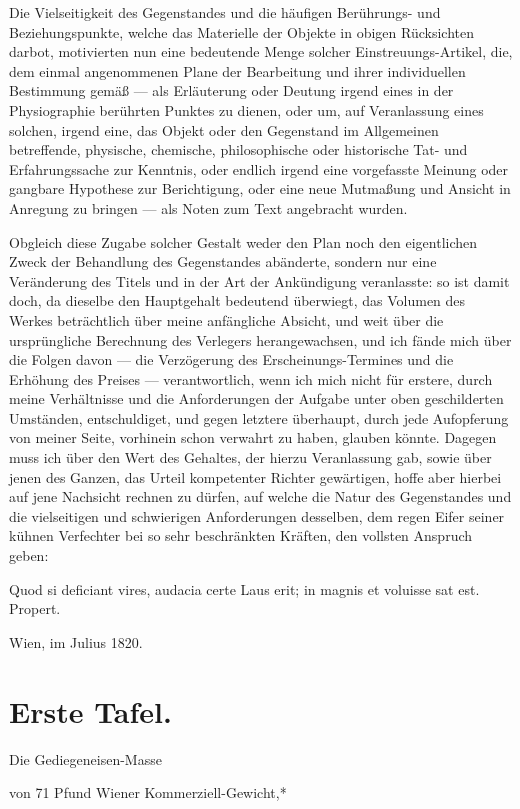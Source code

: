 \documentclass[a4paper, 11pt, oneside, german]{article}
\begin{document}
Die Vielseitigkeit des Gegenstandes und die häufigen Berührungs- und Beziehungspunkte, welche das Materielle der Objekte in obigen Rücksichten darbot, motivierten nun eine bedeutende Menge solcher Einstreuungs-Artikel, die, dem einmal angenommenen Plane der Bearbeitung und ihrer individuellen Bestimmung gemäß --- als Erläuterung oder Deutung irgend eines in der Physiographie berührten Punktes zu dienen, oder um, auf Veranlassung eines solchen, irgend eine, das Objekt oder den Gegenstand im Allgemeinen betreffende, physische, chemische, philosophische oder historische Tat- und Erfahrungssache zur Kenntnis, oder endlich irgend eine vorgefasste Meinung oder gangbare Hypothese zur Berichtigung, oder eine neue Mutmaßung und Ansicht in Anregung zu bringen --- als Noten zum Text angebracht wurden.

Obgleich diese Zugabe solcher Gestalt weder den Plan noch den eigentlichen Zweck der Behandlung des Gegenstandes abänderte, sondern nur eine Veränderung des Titels und in der Art der Ankündigung veranlasste: so ist damit doch, da dieselbe den Hauptgehalt bedeutend überwiegt, das Volumen des Werkes beträchtlich über meine anfängliche Absicht, und weit über die ursprüngliche Berechnung des Verlegers herangewachsen, und ich fände mich über die Folgen davon --- die Verzögerung des Erscheinungs-Termines und die Erhöhung des Preises --- verantwortlich, wenn ich mich nicht für erstere, durch meine Verhältnisse und die Anforderungen der Aufgabe unter oben geschilderten Umständen, entschuldiget, und gegen letztere überhaupt, durch jede Aufopferung von meiner Seite, vorhinein schon verwahrt zu haben, glauben könnte. Dagegen muss ich über den Wert des Gehaltes, der hierzu Veranlassung gab, sowie über jenen des Ganzen, das Urteil kompetenter Richter gewärtigen, hoffe aber hierbei auf jene Nachsicht rechnen zu dürfen, auf welche die Natur des Gegenstandes und die vielseitigen und schwierigen Anforderungen desselben, dem regen Eifer seiner kühnen Verfechter bei so sehr beschränkten Kräften, den vollsten Anspruch geben:

Quod si deficiant vires, audacia certe  
Laus erit; in magnis et voluisse sat est.  
Propert.

Wien, im Julius 1820.

\section{Erste Tafel.}

Die Gediegeneisen-Masse

von 71 Pfund Wiener Kommerziell-Gewicht,*
\end{document}
